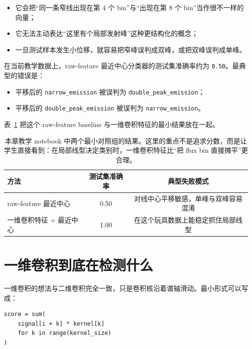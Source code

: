 \begin{itemize}
    \item 它会把“同一条窄线出现在第 4 个 bin”与“出现在第 8 个 bin”当作很不一样的向量；
    \item 它无法主动表达“这里有个局部发射峰”这种更结构化的概念；
    \item 一旦测试样本发生小位移，就容易把窄峰误判成双峰，或把双峰误判成单峰。
\end{itemize}

在当前教学数据上，raw-feature 最近中心分类器的测试集准确率约为 \texttt{0.50}。最典型的错误是：

\begin{itemize}
    \item 平移后的 \texttt{narrow\_emission} 被误判为 \texttt{double\_peak\_emission}；
    \item 平移后的 \texttt{double\_peak\_emission} 被误判为 \texttt{narrow\_emission}。
\end{itemize}

表~\ref{tab:ch32_raw_vs_conv1d} 把这个 raw-feature baseline 与一维卷积特征的最小结果放在一起。

\begin{table}[htbp]
\centering
\begin{tabular}{lcc}
\toprule
方法 & 测试集准确率 & 典型失败模式 \\
\midrule
raw-feature 最近中心 & 0.50 & 对线中心平移敏感，单峰与双峰容易混淆 \\
一维卷积特征 + 最近中心 & 1.00 & 在这个玩具数据上能稳定抓住局部线型 \\
\bottomrule
\end{tabular}
\caption{本章教学 notebook 中两个最小对照组的结果。这里的重点不是追求分数，而是让学生直接看到：在局部线型决定类别时，一维卷积特征比“把 flux bin 直接摊平”更合理。}
\label{tab:ch32_raw_vs_conv1d}
\end{table}

\section{一维卷积到底在检测什么}

一维卷积的想法与二维卷积完全一致，只是卷积核沿着谱轴滑动。最小形式可以写成：

\begin{examplebox}[一个最小一维卷积]
\begin{lstlisting}[style=pythonstyle]
score = sum(
    signal[i + k] * kernel[k]
    for k in range(kernel_size)
)
\end{lstlisting}
\end{examplebox}

